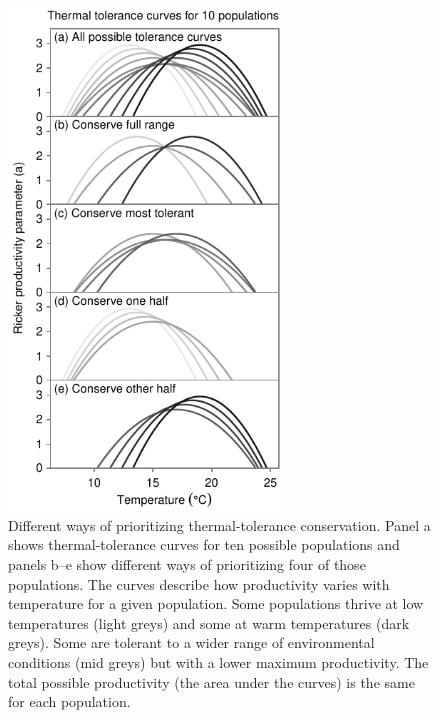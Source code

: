 \begin{figure}[htbp]
\centering
\includegraphics[width=2.9in]{metafolio/Fig2}
\caption[Different ways of prioritizing thermal-tolerance conservation.]{Different ways of prioritizing thermal-tolerance conservation. Panel a shows thermal-tolerance curves for ten possible populations and panels b--e show different ways of prioritizing four of those populations. The curves describe how productivity varies with temperature for a given population. Some populations thrive at low temperatures (light greys) and some at warm temperatures (dark greys). Some are tolerant to a wider range of environmental conditions (mid greys) but with a lower maximum productivity. The total possible productivity (the area under the curves) is the same for each population.} \label{f:curves}
\end{figure}


\clearpage

